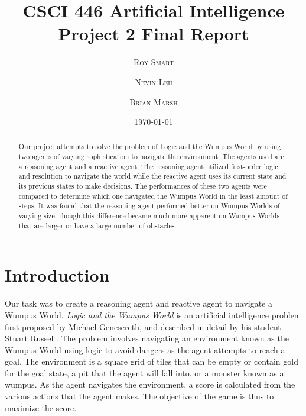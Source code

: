 \documentclass{article}
\title{\vspace{-15mm}\fontsize{24pt}{10pt}\selectfont\textbf{CSCI 446 Artificial Intelligence \\ Project 2 Final Report} \\[-2mm]} %
\date{\today}
\author{
\large
\textsc{Roy Smart} \and \textsc{Nevin Leh} \and \textsc{Brian Marsh}\\[2mm] %
}
\begin{document}
\maketitle %

\thispagestyle{fancy} %



\normalsize

\begin{abstract}
	Our project attempts to solve the problem of Logic and the Wumpus World by using two agents of varying sophistication to navigate the environment.
	 The agents used are a reasoning agent and a reactive agent. The reasoning agent utilized first-order logic and resolution to navigate the world while the reactive agent uses its current state and its previous states to make decisions. The performances of these two agents were compared to determine which one navigated the Wumpus World in the least amount of steps. It was found that the reasoning agent performed better on Wumpus Worlds of varying size, though this difference became much more apparent on Wumpus Worlds that are larger or have a large number of obstacles.
\end{abstract}
\section{Introduction}
Our task was to create a reasoning agent and reactive agent to navigate a Wumpus World.
		\textit{Logic and the Wumpus World} is an artificial intelligence problem first proposed by Michael Genesereth, and described in detail by his student Stuart Russel \cite{ai}.  The problem involves navigating an environment known as the Wumpus World using logic to avoid dangers as the agent attempts to reach a goal.  The environment is a square grid of tiles that can be empty or contain gold for the goal state, a pit that the agent will fall into, or a monster known as a wumpus. 
		 As the agent navigates the environment, a score is calculated from the various actions that the agent makes.  
		 The objective of the game is thus to maximize the score.
		 
\end{document}
